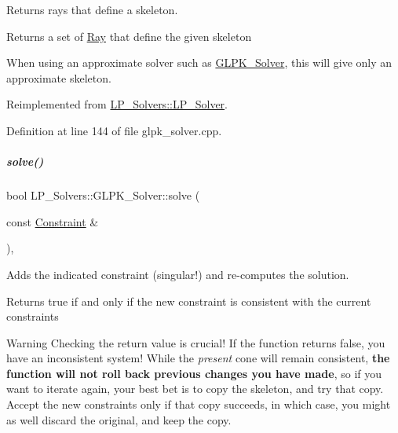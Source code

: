 Returns rays that define a skeleton. 

\begin{DoxyReturn}{Returns}
a set of \hyperlink{group___c_l_s_solvers_class_l_p___solvers_1_1_ray}{Ray} that define the given skeleton
\end{DoxyReturn}
When using an approximate solver such as \hyperlink{group___c_l_s_solvers_class_l_p___solvers_1_1_g_l_p_k___solver}{G\+L\+P\+K\+\_\+\+Solver}, this will give only an approximate skeleton. 

Reimplemented from \hyperlink{group___c_l_s_solvers_a8328f67af66c81db467a6366f48ba3c8}{L\+P\+\_\+\+Solvers\+::\+L\+P\+\_\+\+Solver}.



Definition at line 144 of file glpk\+\_\+solver.\+cpp.

\mbox{\label{group___c_l_s_solvers_aadfa4655b194b3b095db962c5900fee6}} 
\subparagraph{\texorpdfstring{solve()}{solve()}\hspace{0.1cm}{\footnotesize\ttfamily [1/2]}}
{\footnotesize\ttfamily bool L\+P\+\_\+\+Solvers\+::\+G\+L\+P\+K\+\_\+\+Solver\+::solve (\begin{DoxyParamCaption}\item[{const \hyperlink{group___c_l_s_solvers_class_l_p___solvers_1_1_constraint}{Constraint} \&}]{ }\end{DoxyParamCaption})\hspace{0.3cm}{\ttfamily [override]}, {\ttfamily [virtual]}}



Adds the indicated constraint (singular!) and re-\/computes the solution. 

\begin{DoxyReturn}{Returns}
{\ttfamily true} if and only if the new constraint is consistent with the current constraints
\end{DoxyReturn}
\begin{DoxyWarning}{Warning}
Checking the return value is crucial! If the function returns {\ttfamily false}, you have an inconsistent system! While the {\itshape present} cone will remain consistent, {\bfseries the function will not roll back previous changes you have made}, so if you want to iterate again, your best bet is to copy the skeleton, and try that copy. Accept the new constraints only if that copy succeeds, in which case, you might as well discard the original, and keep the copy. 
\end{DoxyWarning}


